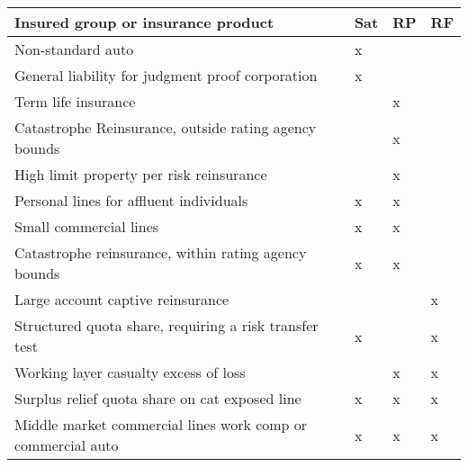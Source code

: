 \documentclass[
  11pt,
  a4paper,
  DIV=11,
  numbers=noendperiod]{scrartcl}
\begin{document}
\begin{longtable}[]{@{}
  >{\raggedright\arraybackslash}p{}
  >{\centering\arraybackslash}p{}
  >{\centering\arraybackslash}p{}
  >{\centering\arraybackslash}p{}@{}}
\toprule\noalign{}
\begin{minipage}[b]{\linewidth}\raggedright
\textbf{Insured group or insurance product}
\end{minipage} & \begin{minipage}[b]{\linewidth}\centering
\textbf{Sat}
\end{minipage} & \begin{minipage}[b]{\linewidth}\centering
\textbf{RP}
\end{minipage} & \begin{minipage}[b]{\linewidth}\centering
\textbf{RF}
\end{minipage} \\
\midrule\noalign{}
\endhead
\bottomrule\noalign{}
\endlastfoot
Non-standard auto & x & & \\
General liability for judgment proof corporation & x & & \\
Term life insurance & & x & \\
Catastrophe Reinsurance, outside rating agency bounds & & x & \\
High limit property per risk reinsurance & & x & \\
Personal lines for affluent individuals & x & x & \\
Small commercial lines & x & x & \\
Catastrophe reinsurance, within rating agency bounds & x & x & \\
Large account captive reinsurance & & & x \\
Structured quota share, requiring a risk transfer test & x & & x \\
Working layer casualty excess of loss & & x & x \\
Surplus relief quota share on cat exposed line & x & x & x \\
Middle market commercial lines work comp or commercial auto & x & x &
x \\
\end{longtable}
\end{document}
